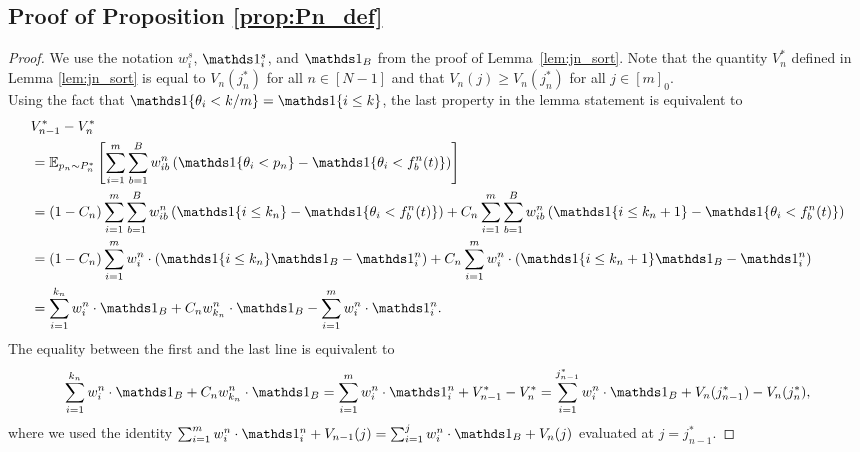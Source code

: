 \subsection{Proof of Proposition \ref{prop:Pn_def}} \label{pf:Pn_def}
\begin{proof}
  We use the notation $w_i^s$, $\one_i^s$, and $\one_B$ from the proof of Lemma~\ref{lem:jn_sort}. 
  Note that the quantity $V_n^*$ defined in Lemma \ref{lem:jn_sort} is equal to $V_n(j_n^*)$ for all $n \in [N-1]$ and that $V_n(j) \geq V_n(j_n^*)$ for all $j \in [m]_0$.
  \\
  Using the fact that $\indi{\theta_i < k/m} = \indi{i \leq k}$, the last property in the lemma statement is equivalent to 
  \begin{align*} 
  & V_{n-1}^* - V_n^* \\
  & = \E_{p_n \sim P_n^*} \left[ \sum_{i=1}^{m} \sum_{b=1}^B w_{ib}^n \left( \indi{\theta_i < p_n} - \indi{\theta_i < f_b^n(t)} \right) \right] \nonumber\\
  & = (1-C_n) \sum_{i=1}^{m} \sum_{b=1}^B w_{ib}^n \left( \indi{i \leq k_n} - \indi{\theta_i < f_b^n(t)} \right) + C_n \sum_{i=1}^{m} \sum_{b=1}^B w_{ib}^n \left( \indi{i \leq k_n+1} - \indi{\theta_i < f_b^n(t)} \right) \nonumber\\
  & = (1-C_n) \sum_{i=1}^{m} w_{i}^n \cdot \left( \indi{i \leq k_n} \one_B - \one_i^n \right) + C_n \sum_{i=1}^{m} w_{i}^n \cdot \left( \indi{i \leq k_n+1} \one_B - \one_i^n \right) \nonumber\\
  & = \sum_{i=1}^{k_n} w_i^n \cdot \one_B + C_n w_{k_n}^n \cdot \one_B - \sum_{i=1}^{m} w_i^n \cdot \one_i^n.
  \end{align*}
  The equality between the first and the last line is equivalent to
  \begin{align}
  \sum_{i=1}^{k_n} w_i^n \cdot \one_B + C_n w_{k_n}^n \cdot \one_B
  = \sum_{i=1}^{m} w_i^n \cdot \one_i^n + V_{n-1}^* - V_n^* 
  = \sum_{i=1}^{j_{n-1}^*} w_i^n \cdot \one_B + V_n(j_{n-1}^*) - V_n(j_n^*), \label{eq:Pn_eq}
  \end{align}
  where we used the identity $\sum_{i=1}^{m} w_i^n \cdot \one_i^n + V_{n-1}(j) = \sum_{i=1}^{j} w_i^n \cdot \one_B + V_n(j)$ evaluated at $j=j_{n-1}^*$.

\end{proof}

